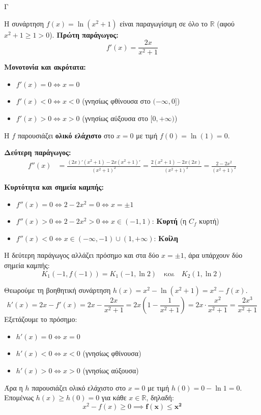 \begin{thema}{Γ}
\begin{erwthma}
\item Η συνάρτηση $f(x) = \ln(x^2+1)$ είναι παραγωγίσιμη σε όλο το $\mathbb{R}$ (αφού $x^2+1 \ge 1 > 0$).
\textbf{Πρώτη παράγωγος:}
\[ f'(x) = \frac{2x}{x^2+1} \]

\textbf{Μονοτονία και ακρότατα:}
\begin{itemize}
    \item $f'(x) = 0 \Leftrightarrow x = 0$
    \item $f'(x) < 0 \Leftrightarrow x < 0$ (γνησίως φθίνουσα στο $(-\infty, 0]$)
    \item $f'(x) > 0 \Leftrightarrow x > 0$ (γνησίως αύξουσα στο $[0, +\infty)$)
\end{itemize}
Η $f$ παρουσιάζει \textbf{ολικό ελάχιστο} στο $x = 0$ με τιμή $f(0) = \ln(1) = 0$.

\textbf{Δεύτερη παράγωγος:}
\begin{align*}
f''(x) &= \frac{(2x)'(x^2+1) - 2x(x^2+1)'}{(x^2+1)^2} = \frac{2(x^2+1) - 2x(2x)}{(x^2+1)^2} = \frac{2-2x^2}{(x^2+1)^2}
\end{align*}

\textbf{Κυρτότητα και σημεία καμπής:}
\begin{itemize}
    \item $f''(x) = 0 \Leftrightarrow 2 - 2x^2 = 0 \Leftrightarrow x = \pm 1$
    \item $f''(x) > 0 \Leftrightarrow 2-2x^2 > 0 \Leftrightarrow x \in (-1, 1)$: \textbf{Κυρτή} (η $C_f$ κυρτή)
    \item $f''(x) < 0 \Leftrightarrow x \in (-\infty,-1) \cup (1, +\infty)$: \textbf{Κοίλη}
\end{itemize}
Η δεύτερη παράγωγος αλλάζει πρόσημο και στα δύο $x = \pm 1$, άρα υπάρχουν δύο σημεία καμπής:
\[ K_1(-1, f(-1)) = K_1\left(-1, \ln 2\right) \quad \text{και} \quad K_2(1, \ln 2) \]

\item Θεωρούμε τη βοηθητική συνάρτηση $h(x) = x^2 - \ln(x^2+1) = x^2 - f(x)$.
\[ h'(x) = 2x - f'(x) = 2x - \frac{2x}{x^2+1} = 2x\left(1 - \frac{1}{x^2+1}\right) = 2x \cdot \frac{x^2}{x^2+1} = \frac{2x^3}{x^2+1} \]
Εξετάζουμε το πρόσημο:
\begin{itemize}
    \item $h'(x) = 0 \Leftrightarrow x = 0$
    \item $h'(x) < 0 \Leftrightarrow x < 0$ (γνησίως φθίνουσα)
    \item $h'(x) > 0 \Leftrightarrow x > 0$ (γνησίως αύξουσα)
\end{itemize}
Άρα η $h$ παρουσιάζει ολικό ελάχιστο στο $x=0$ με τιμή $h(0) = 0 - \ln 1 = 0$.
Επομένως $h(x) \ge h(0) = 0$ για κάθε $x \in \mathbb{R}$, δηλαδή:
\[ x^2 - f(x) \ge 0 \implies \boldsymbol{f(x) \le x^2} \]


\end{erwthma}
\end{thema}
